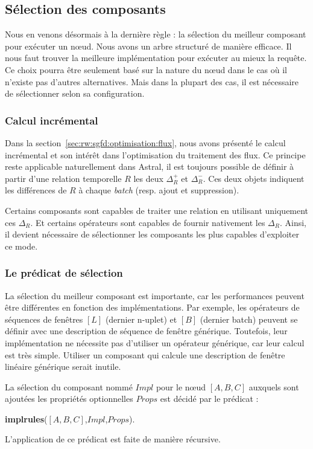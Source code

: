 \subsection{Sélection des composants}
Nous en venons désormais à la dernière règle : la sélection du meilleur composant pour exécuter un nœud. Nous avons un arbre structuré de manière efficace. Il nous faut trouver la meilleure implémentation pour exécuter au mieux la requête. Ce choix pourra être seulement basé sur la nature du nœud dans le cas où il n'existe pas d'autres alternatives. Mais dans la plupart des cas, il est nécessaire de sélectionner selon sa configuration.

\subsubsection{Calcul incrémental}
Dans la section~\ref{sec:rw:sgfd:optimisation:flux}, nous avons présenté le calcul incrémental et son intérêt dans l'optimisation du traitement des flux. Ce principe reste applicable naturellement dans Astral, il est toujours possible de définir à partir d'une relation temporelle $R$ les deux $\Delta_R^+$ et $\Delta_R^-$. Ces deux objets indiquent les différences de $R$ à chaque \textit{batch} (resp. ajout et suppression). 

Certains composants sont capables de traiter une relation en utilisant uniquement ces $\Delta_R$. Et certains opérateurs sont capables de fournir nativement les $\Delta_R$. Ainsi, il devient nécessaire de sélectionner les composants les plus capables d'exploiter ce mode.

\subsubsection{Le prédicat de sélection}
La sélection du meilleur composant est importante, car les performances peuvent être différentes en fonction des implémentations. Par exemple, les opérateurs de séquences de fenêtres $[L]$ (dernier n-uplet) et $[B]$ (dernier batch) peuvent se définir avec une description de séquence de fenêtre générique. Toutefois, leur implémentation ne nécessite pas d'utiliser un opérateur générique, car leur calcul est très simple. Utiliser un composant qui calcule une description de fenêtre linéaire générique serait inutile.

\begin{regle}
La sélection du composant nommé $Impl$ pour le nœud $[A,B,C]$ auxquels sont ajoutées les propriétés optionnelles $Props$ est décidé par le prédicat :
\begin{center} \textbf{implrules}($[A,B,C]$,$Impl$,$Props$).\end{center}
L'application de ce prédicat est faite de manière récursive.
\end{regle}

